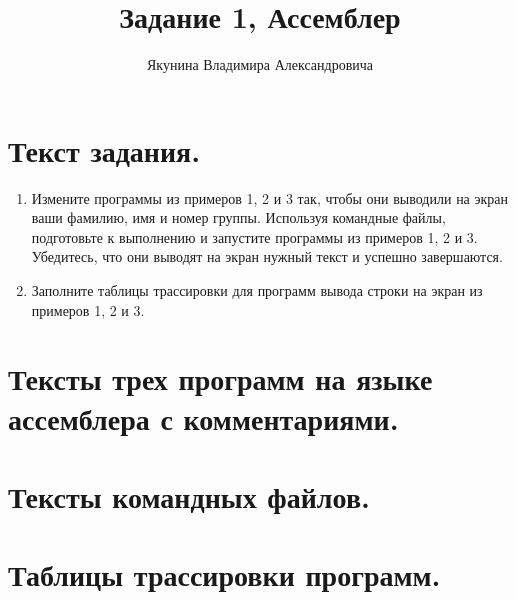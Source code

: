 \documentclass{report}
\begin{document}
\title{Задание 1, Ассемблер}
\author{Якунина Владимира Александровича}
\maketitle

\section{Текст задания.}

\begin{enumerate}
\item Измените программы из примеров 1, 2 и 3 так, чтобы они выводили на экран ваши фамилию, имя и номер группы. Используя командные файлы, подготовьте к выполнению и запустите программы из примеров 1, 2 и 3. Убедитесь, что они выводят на экран нужный текст и успешно завершаются.
\item Заполните таблицы трассировки для программ вывода строки на экран из примеров 1, 2 и 3.
\end{enumerate}

\section{Тексты трех программ на языке ассемблера с комментариями.}







\section{Тексты командных файлов.}







\section{Таблицы трассировки программ.}
\end{document}
